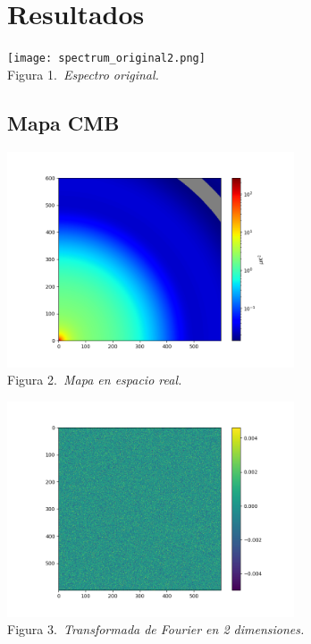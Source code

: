 \documentclass[twocolumn,letterpaper,spanish]{revtex4}
\numberwithin{equation}{section}
\begin{document}
\section{Resultados}\label{resultados}

\begin{center}
   \texttt{[image: spectrum\_original2.png]}\\
   Figura 1.\emph{\ Espectro original.}
\end{center}
  


\subsection{Mapa CMB}

\begin{center}
   \includegraphics[width=85mm]{M_tilde.png}\\
   Figura 2.\emph{\ Mapa en espacio real.}
\end{center}

\begin{center}
   \includegraphics[width=85mm]{G_ell.png}\\
   Figura 3.\emph{\ Transformada de Fourier en 2 dimensiones.}
\end{center}
\end{document}

